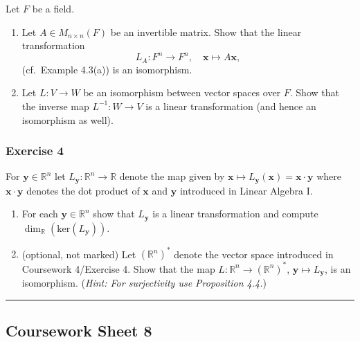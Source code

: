 \documentclass[
  12pt,
  a4paper,
  twoside]{article}
\theoremstyle{plain}
\theoremstyle{definition}
\begin{document}
Let \(F\) be a field.

\begin{enumerate}
\def\labelenumi{(\alph{enumi})}
\item
  Let \(A \in M_{n \times n}(F)\) be an invertible matrix. Show
  that the linear transformation
  \[L_A: F^n \rightarrow F^n, \quad \mathbf{x} \mapsto A\mathbf{x},\]
  (cf.~Example 4.3(a)) is an isomorphism.
\item
  Let \(L: V \rightarrow W\) be an isomorphism between vector
  spaces over \(F\). Show that the inverse map \(L^{-1}:W \rightarrow V\) is a linear transformation (and hence an isomorphism as well).
\end{enumerate}

\hypertarget{exercise-4-4}{%
\subsubsection*{Exercise 4}\label{exercise-4-4}}

For \(\mathbf{y} \in \mathbb{R}^n\) let \(L_{\mathbf{y}}: \mathbb{R}^n \to \mathbb{R}\) denote
the map given by \(\mathbf{x} \mapsto L_{\mathbf{y}}(\mathbf{x}) = \mathbf{x} \cdot \mathbf{y}\) where \(\mathbf{x} \cdot \mathbf{y}\) denotes the dot
product of \(\mathbf{x}\) and \(\mathbf{y}\) introduced in Linear Algebra I.

\begin{enumerate}
\def\labelenumi{(\alph{enumi})}
\item
  For each \(\mathbf{y} \in \mathbb{R}^n\) show that \(L_\mathbf{y}\) is a linear
  transformation and compute \(\dim_{\mathbb{R}}(\textrm{ker}(L_\mathbf{y}))\).
\item
  (optional, not marked) Let \((\mathbb{R}^n)^*\) denote the vector space introduced in
  Coursework 4/Exercise 4. Show that the map \(L: \mathbb{R}^n \to (\mathbb{R}^n)^*\), \(\mathbf{y} \mapsto L_\mathbf{y}\), is an isomorphism.
  (\emph{Hint: For surjectivity use Proposition 4.4.})
\end{enumerate}

\begin{center}\rule{0.5\linewidth}{0.5pt}\end{center}

\hypertarget{coursework-sheet-8}{%
\subsection{Coursework Sheet 8}\label{coursework-sheet-8}}
\end{document}
